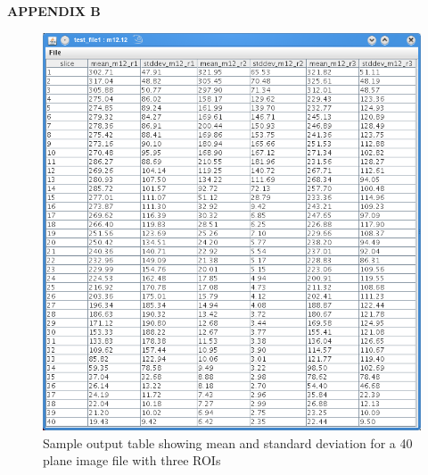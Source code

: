 \documentclass{article}
\begin{document}
\newpage
\begin{center}\LARGE{\textbf{APPENDIX B}}\end{center} 
\vfill
\begin{figure}[h]
\centering
\includegraphics[scale=0.8]{snapshot_Table.png}
\caption{Sample output table showing mean and standard deviation
for a 40 plane image file with three ROIs}
\end{figure}
\vfill
\end{document}
